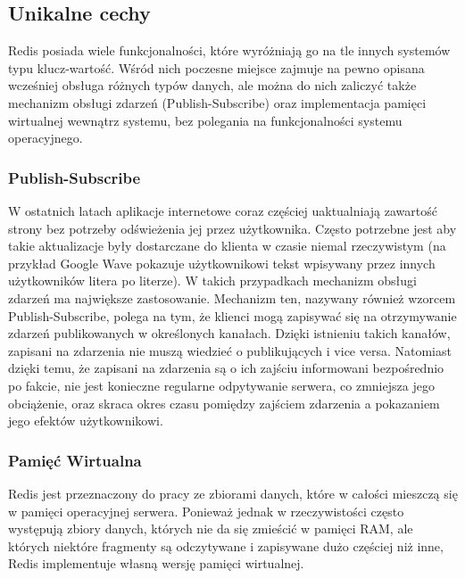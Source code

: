 \subsection*{Unikalne cechy}

Redis posiada wiele funkcjonalności, które wyróżniają go na tle innych systemów typu klucz-wartość.
Wśród nich poczesne miejsce zajmuje na pewno opisana wcześniej obsługa różnych typów danych, ale można do nich zaliczyć także mechanizm obsługi zdarzeń (Publish-Subscribe) oraz implementacja pamięci wirtualnej wewnątrz systemu, bez polegania na funkcjonalności systemu operacyjnego.

\subsubsection*{Publish-Subscribe}

W ostatnich latach aplikacje internetowe coraz częściej uaktualniają zawartość strony bez potrzeby odświeżenia jej przez użytkownika.
Często potrzebne jest aby takie aktualizacje były dostarczane do klienta w czasie niemal rzeczywistym (na przykład Google Wave pokazuje użytkownikowi tekst wpisywany przez innych użytkowników litera po literze).
W takich przypadkach mechanizm obsługi zdarzeń ma największe zastosowanie.
Mechanizm ten, nazywany również wzorcem Publish-Subscribe, polega na tym, że klienci mogą zapisywać się na otrzymywanie zdarzeń publikowanych w określonych kanałach.
Dzięki istnieniu takich kanałów, zapisani na zdarzenia nie muszą wiedzieć o publikujących i vice versa.
Natomiast dzięki temu, że zapisani na zdarzenia są o ich zajściu informowani bezpośrednio po fakcie, nie jest konieczne regularne odpytywanie serwera, co zmniejsza jego obciążenie, oraz skraca okres czasu pomiędzy zajściem zdarzenia a pokazaniem jego efektów użytkownikowi.

\subsubsection*{Pamięć Wirtualna}

Redis jest przeznaczony do pracy ze zbiorami danych, które w całości mieszczą się w pamięci operacyjnej serwera.
Ponieważ jednak w rzeczywistości często występują zbiory danych, których nie da się zmieścić w pamięci RAM, ale których niektóre fragmenty są odczytywane i zapisywane dużo częściej niż inne, Redis implementuje własną wersję pamięci wirtualnej.

